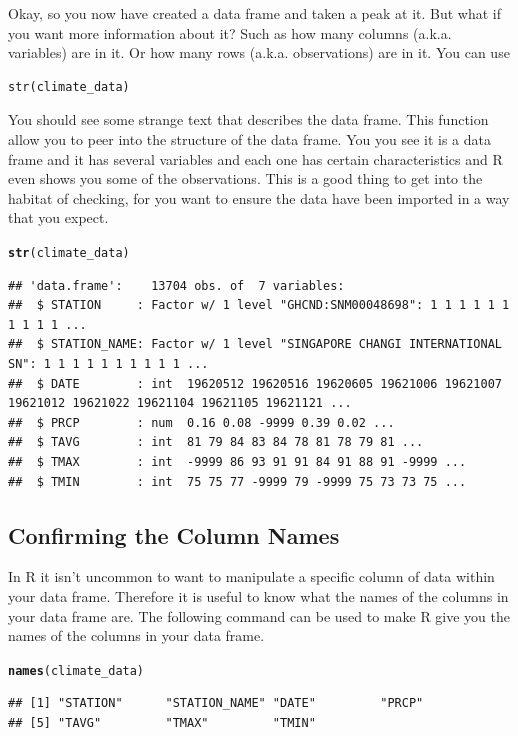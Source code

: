 \documentclass{article}\usepackage[]{graphicx}\usepackage[]{color}
\makeatletter
\newcommand{\hlstd}[1]{\textcolor[rgb]{0.345,0.345,0.345}{#1}}%
\newcommand{\hlkwd}[1]{\textcolor[rgb]{0.737,0.353,0.396}{\textbf{#1}}}%
\newenvironment{kframe}{%
 \def\at@end@of@kframe{}%
 \ifinner\ifhmode%
  \def\at@end@of@kframe{\end{minipage}}%
  \begin{minipage}{\columnwidth}%
 \fi\fi%
 \def\FrameCommand##1{\hskip\@totalleftmargin \hskip-\fboxsep
 \colorbox{shadecolor}{##1}\hskip-\fboxsep
     \hskip-\linewidth \hskip-\@totalleftmargin \hskip\columnwidth}%
 \MakeFramed {\advance\hsize-\width
   \@totalleftmargin\z@ \linewidth\hsize
   \@setminipage}}%
 {\par\unskip\endMakeFramed%
 \at@end@of@kframe}
\newenvironment{knitrout}{}{} %
\makeatother
\begin{document}
Okay, so you now have created a data frame and taken a peak at it. But what if you want more information about it? Such as how many columns (a.k.a. variables) are in it. Or how many rows (a.k.a. observations) are in it. You can use \\
\begin{verbatim}
str(climate_data)
\end{verbatim} 
You should see some strange text that describes the data frame. This function allow you to peer into the structure of the data frame. You you see it is a data frame and it has several variables and each one has certain characteristics and R even shows you some of the observations. This is a good thing to get into the habitat of checking, for you want to ensure the data have been imported in a way that you expect.
\begin{knitrout}
\color{fgcolor}\begin{kframe}
\begin{alltt}
\hlkwd{str}\hlstd{(climate_data)}
\end{alltt}
\begin{verbatim}
## 'data.frame':	13704 obs. of  7 variables:
##  $ STATION     : Factor w/ 1 level "GHCND:SNM00048698": 1 1 1 1 1 1 1 1 1 1 ...
##  $ STATION_NAME: Factor w/ 1 level "SINGAPORE CHANGI INTERNATIONAL SN": 1 1 1 1 1 1 1 1 1 1 ...
##  $ DATE        : int  19620512 19620516 19620605 19621006 19621007 19621012 19621022 19621104 19621105 19621121 ...
##  $ PRCP        : num  0.16 0.08 -9999 0.39 0.02 ...
##  $ TAVG        : int  81 79 84 83 84 78 81 78 79 81 ...
##  $ TMAX        : int  -9999 86 93 91 91 84 91 88 91 -9999 ...
##  $ TMIN        : int  75 75 77 -9999 79 -9999 75 73 73 75 ...
\end{verbatim}
\end{kframe}
\end{knitrout}
\subsection{Confirming the Column Names}
In R it isn't uncommon to want to manipulate a specific column of data within your data frame. Therefore it is useful to know what the names of the columns in your data frame are. The following command can be used to make R give you the names of the columns in your data frame. 

\begin{knitrout}
\color{fgcolor}\begin{kframe}
\begin{alltt}
\hlkwd{names}\hlstd{(climate_data)}
\end{alltt}
\begin{verbatim}
## [1] "STATION"      "STATION_NAME" "DATE"         "PRCP"        
## [5] "TAVG"         "TMAX"         "TMIN"
\end{verbatim}
\end{kframe}
\end{knitrout}
\end{document}

